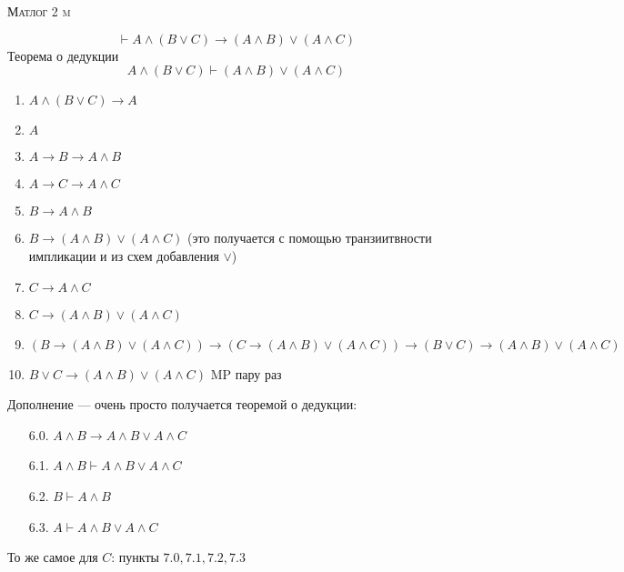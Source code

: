\documentclass[10pt]{article}
\theoremstyle{definition}
\begin{document}
\def\chap#1#2{\ \\ {\large\bf#1 \ | \ \tt\scshape#2} \par}

\ \vspace{-1cm}

{\bf
\ \\
\Large\centerline{\scshape Матлог 2 m}
}\normalsize

\[ \vdash A \land (B \lor C) \to (A \land B) \lor (A \land C)\]
Теорема о дедукции
\[A \land (B\lor C) \vdash (A \land B) \lor (A \land C) \]
\begin{enumerate}
    \item $A \land (B \lor C) \to A$
    \item $A$
    \item $A \to B \to A \land B$
    \item $A \to C \to A \land C$
    \item $B \to A \land B$
    \item $B \to (A \land B) \lor (A \land C)$ (это получается с помощью транзиитвности импликации и из схем добавления $\lor$)
    \item $C \to A \land C$
    \item $C \to (A \land B) \lor (A \land C)$
    \item $(B \to (A \land B) \lor (A \land C)) \to (C \to (A \land B) \lor (A \land C)) \to (B \lor C) \to (A \land B) \lor (A \land C)$
    \item $B \lor C \to (A \land B) \lor (A \land C)$ MP пару раз 
\end{enumerate}

Дополнение --- очень просто получается теоремой о дедукции: 
\begin{itemize}
    \item[6.0.] $A \land B \to A \land B \lor A\land C$ 
    \item[6.1.] $A \land B \vdash A \land B \lor A\land C$  
    \item[6.2.] $B \vdash A \land B$ 
    \item[6.3.] $A \vdash A \land B \lor A\land C$  
\end{itemize}
То же самое для $C$: пункты $7.0, 7.1, 7.2, 7.3$
\end{document}
